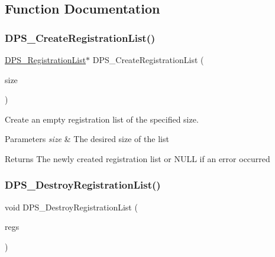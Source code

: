 \subsection{Function Documentation}
\mbox{\label{group__registration_ga3d1f2e10a8d3ffd66cf4c3ba5c53b490}} 
\subsubsection{\texorpdfstring{D\+P\+S\+\_\+\+Create\+Registration\+List()}{DPS\_CreateRegistrationList()}}
{\footnotesize\ttfamily \hyperlink{group__registration_ga2b9489ff306ad253d24b03c418a6eda0}{D\+P\+S\+\_\+\+Registration\+List}$\ast$ D\+P\+S\+\_\+\+Create\+Registration\+List (\begin{DoxyParamCaption}\item[{uint8\+\_\+t}]{size }\end{DoxyParamCaption})}



Create an empty registration list of the specified size. 


\begin{DoxyParams}{Parameters}
{\em size} & The desired size of the list\\
\hline
\end{DoxyParams}
\begin{DoxyReturn}{Returns}
The newly created registration list or N\+U\+LL if an error occurred 
\end{DoxyReturn}
\mbox{\label{group__registration_ga0dbaa5dbea47290035a11dc22fc45f2d}} 
\subsubsection{\texorpdfstring{D\+P\+S\+\_\+\+Destroy\+Registration\+List()}{DPS\_DestroyRegistrationList()}}
{\footnotesize\ttfamily void D\+P\+S\+\_\+\+Destroy\+Registration\+List (\begin{DoxyParamCaption}\item[{\hyperlink{group__registration_ga2b9489ff306ad253d24b03c418a6eda0}{D\+P\+S\+\_\+\+Registration\+List} $\ast$}]{regs }\end{DoxyParamCaption})}



